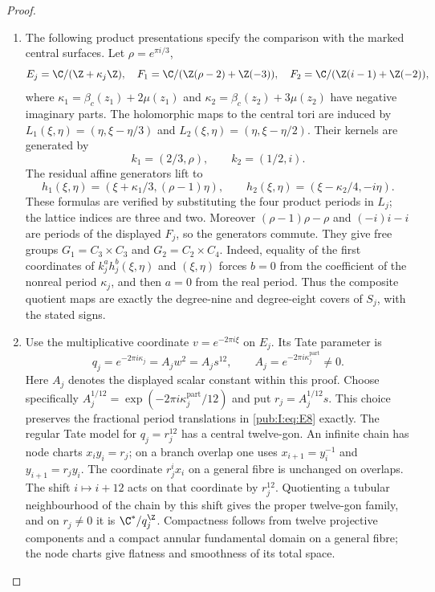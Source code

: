 \begin{proof}
\begin{enumerate}[label=\arabic*.,leftmargin=*]
\item The following product presentations specify the comparison
with the marked central surfaces. Let
$\rho=e^{\pi i/3}$,
\[
 E_j=\C/(\Z+\kappa_j\Z),\quad
 F_1=\C/(\Z(\rho-2)+\Z(-3)),\quad
 F_2=\C/(\Z(i-1)+\Z(-2)),
\]
where $\kappa_1=\beta_c(z_1)+2\mu(z_1)$ and
$\kappa_2=\beta_c(z_2)+3\mu(z_2)$ have negative imaginary parts.
The holomorphic maps to the central tori are induced by
$L_1(\xi,\eta)=(\eta,\xi-\eta/3)$ and
$L_2(\xi,\eta)=(\eta,\xi-\eta/2)$. Their kernels are generated by
\[
 k_1=(2/3,\rho),\qquad k_2=(1/2,i).
\]
The residual affine generators lift to
\begin{equation}
 h_1(\xi,\eta)=(\xi+\kappa_1/3,(\rho-1)\eta),\qquad
 h_2(\xi,\eta)=(\xi-\kappa_2/4,-i\eta).
\label{pub:I:eq:E8}
\end{equation}
These formulas are verified by substituting the four product periods
in $L_j$; the lattice indices are three and two. Moreover
$(\rho-1)\rho-\rho$ and $(-i)i-i$ are periods of the displayed
$F_j$, so the generators commute. They give free groups
$G_1=C_3\times C_3$ and $G_2=C_2\times C_4$. Indeed, equality of
the first coordinates of $k_j^a h_j^b(\xi,\eta)$ and $(\xi,\eta)$
forces $b=0$ from the coefficient of the nonreal period $\kappa_j$,
and then $a=0$ from the real period. Thus the composite quotient
maps are exactly the degree-nine and degree-eight covers of $S_j$,
with the stated signs.

\item Use the multiplicative coordinate $v=e^{-2\pi i\xi}$ on $E_j$.
Its Tate parameter is
\[
       q_j=e^{-2\pi i\kappa_j}=A_jw^2=A_js^{12},
       \qquad A_j=e^{-2\pi i\kappa_j^{\mathrm{part}}}\ne0.
\]
Here $A_j$ denotes the displayed scalar constant within this proof. Choose specifically
$A_j^{1/12}=\exp(-2\pi i\kappa_j^{\mathrm{part}}/12)$ and put
$r_j=A_j^{1/12}s$. This choice preserves the fractional period
translations in \eqref{pub:I:eq:E8} exactly. The regular Tate model for $q_j=r_j^{12}$
has a central twelve-gon. An infinite chain has node charts
$x_i y_i=r_j$; on a branch overlap one uses
$x_{i+1}=y_i^{-1}$ and $y_{i+1}=r_jy_i$. The coordinate
$r_j^i x_i$ on a general fibre is unchanged on overlaps.
The shift $i\mapsto i+12$ acts on that coordinate by $r_j^{12}$.
Quotienting a tubular neighbourhood of the chain by this shift gives
the proper twelve-gon family, and on $r_j\ne0$ it is
$\C^*/q_j^\Z$. Compactness follows from twelve projective components
and a compact annular fundamental domain on a general fibre;
the node charts give flatness and smoothness of its total space.


\end{enumerate}
\end{proof}
